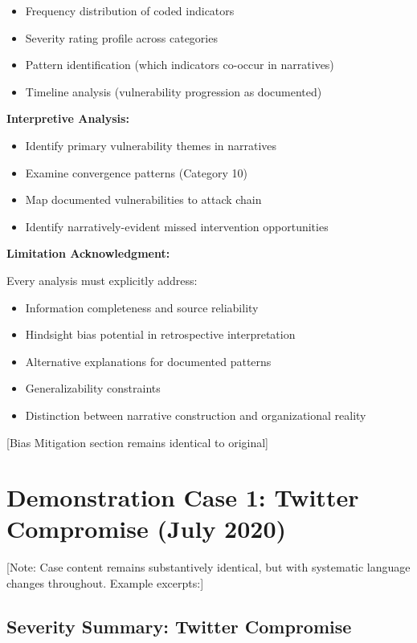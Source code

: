 \documentclass[11pt,a4paper]{article}
\begin{document}
\begin{itemize}
\item Frequency distribution of coded indicators
\item Severity rating profile across categories
\item Pattern identification (which indicators co-occur in narratives)
\item Timeline analysis (vulnerability progression as documented)
\end{itemize}

\textbf{Interpretive Analysis:}

\begin{itemize}
\item Identify primary vulnerability themes in narratives
\item Examine convergence patterns (Category 10)
\item Map documented vulnerabilities to attack chain
\item Identify narratively-evident missed intervention opportunities
\end{itemize}

\textbf{Limitation Acknowledgment:}

Every analysis must explicitly address:
\begin{itemize}
\item Information completeness and source reliability
\item Hindsight bias potential in retrospective interpretation
\item Alternative explanations for documented patterns
\item Generalizability constraints
\item Distinction between narrative construction and organizational reality
\end{itemize}

[Bias Mitigation section remains identical to original]

\section{Demonstration Case 1: Twitter Compromise (July 2020)}

[Note: Case content remains substantively identical, but with systematic language changes throughout. Example excerpts:]

\subsection{Severity Summary: Twitter Compromise}
\end{document}
